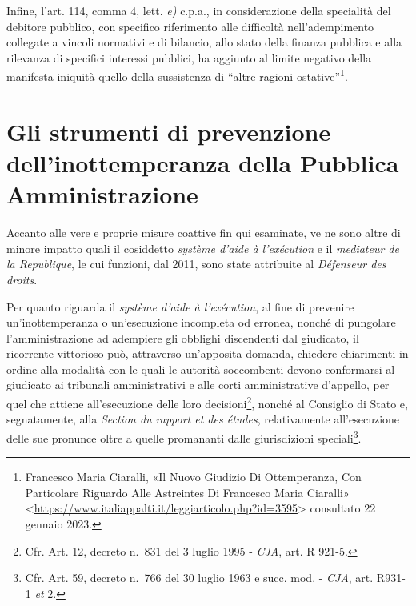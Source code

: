 \documentclass[12pt,it,a4paper,]{report}
\begin{document}
Infine, l'art. 114, comma 4, lett. \emph{e)} c.p.a., in considerazione
della specialità del debitore pubblico, con specifico riferimento alle
difficoltà nell'adempimento collegate a vincoli normativi e di bilancio,
allo stato della finanza pubblica e alla rilevanza di specifici
interessi pubblici, ha aggiunto al limite negativo della manifesta
iniquità quello della sussistenza di ``altre ragioni
ostative''\footnote{{Francesco Maria Ciaralli, {«Il Nuovo Giudizio Di
  Ottemperanza, Con Particolare Riguardo Alle Astreintes Di {Francesco
  Maria Ciaralli}»}
  \textless{}\url{https://www.italiappalti.it/leggiarticolo.php?id=3595}\textgreater{}
  consultato 22 gennaio 2023.}}.

\hypertarget{gli-strumenti-di-prevenzione-dellinottemperanza-della-pubblica-amministrazione}{%
\section{Gli strumenti di prevenzione dell'inottemperanza della Pubblica
Amministrazione}\label{gli-strumenti-di-prevenzione-dellinottemperanza-della-pubblica-amministrazione}}

Accanto alle vere e proprie misure coattive fin qui esaminate, ve ne
sono altre di minore impatto quali il cosiddetto \emph{système d'aide à
l'exécution} e il \emph{mediateur de la Republique}, le cui funzioni,
dal 2011, sono state attribuite al \emph{Défenseur des droits}.

Per quanto riguarda il \emph{système d'aide à l'exécution}, al fine di
prevenire un'inottemperanza o un'esecuzione incompleta od erronea,
nonché di pungolare l'amministrazione ad adempiere gli obblighi
discendenti dal giudicato, il ricorrente vittorioso può, attraverso
un'apposita domanda, chiedere chiarimenti in ordine alla modalità con le
quali le autorità soccombenti devono conformarsi al giudicato ai
tribunali amministrativi e alle corti amministrative d'appello, per quel
che attiene all'esecuzione delle loro decisioni\footnote{Cfr. Art. 12,
  decreto n.~831 del 3 luglio 1995 - \emph{CJA}, art. R 921-5.}, nonché
al Consiglio di Stato e, segnatamente, alla \emph{Section du rapport et
des études}, relativamente all'esecuzione delle sue pronunce oltre a
quelle promananti dalle giurisdizioni speciali\footnote{Cfr. Art. 59,
  decreto n.~766 del 30 luglio 1963 e succ. mod. - \emph{CJA}, art.
  R931-1 \emph{et} 2.}.
\end{document}
